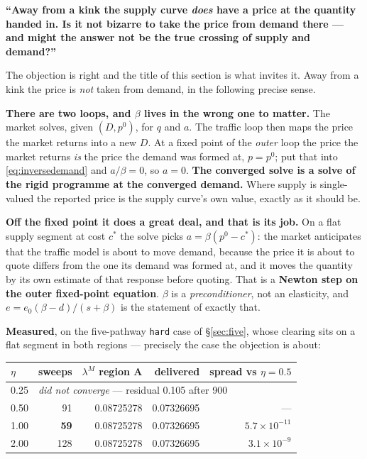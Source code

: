 \documentclass[11pt,a4paper]{article}
\newcommand{\var}[1]{\texttt{\small #1}}
\begin{document}
\begin{keybox}
\textbf{``Away from a kink the supply curve \emph{does} have a price at the quantity handed
in. Is it not bizarre to take the price from demand there --- and might the answer not be
the true crossing of supply and demand?''}

\medskip
The objection is right and the title of this section is what invites it. Away from a kink
the price is \emph{not} taken from demand, in the following precise sense.

\medskip
\textbf{There are two loops, and $\beta$ lives in the wrong one to matter.} The market
solves, given $(D, p^{0})$, for $q$ and $a$. The traffic loop then maps the price the
market returns into a new $D$. At a fixed point of the \emph{outer} loop the price the
market returns \emph{is} the price the demand was formed at, $p = p^{0}$; put that into
\eqref{eq:inversedemand} and $a/\beta = 0$, so $a = 0$. \textbf{The converged solve is a
solve of the rigid programme at the converged demand.} Where supply is single-valued the
reported price is the supply curve's own value, exactly as it should be.

\medskip
\textbf{Off the fixed point it does a great deal, and that is its job.} On a flat supply
segment at cost $c^{*}$ the solve picks $a = \beta(p^{0} - c^{*})$: the market anticipates
that the traffic model is about to move demand, because the price it is about to quote
differs from the one its demand was formed at, and it moves the quantity by its own
estimate of that response before quoting. That is a \textbf{Newton step on the outer
fixed-point equation}. $\beta$ is a \emph{preconditioner}, not an elasticity, and
$e = e_{0}(\beta-d)/(s+\beta)$ is the statement of exactly that.

\medskip
\textbf{Measured}, on the five-pathway \var{hard} case of \S\ref{sec:five}, whose clearing
sits on a flat segment in both regions --- precisely the case the objection is about:

\medskip
\begin{center}\small
\begin{tabular}{@{}lrrrr@{}}
\toprule
$\eta$ & \textbf{sweeps} & $\lambda^{M}$ region A & \textbf{delivered} &
  \textbf{spread vs $\eta=0.5$} \\
\midrule
0.25 & \multicolumn{4}{l}{\emph{did not converge} --- residual 0.105 after 900} \\
0.50 & 91 & 0.08725278 & 0.07326695 & --- \\
1.00 & \textbf{59} & 0.08725278 & 0.07326695 & $5.7\times10^{-11}$ \\
2.00 & 128 & 0.08725278 & 0.07326695 & $3.1\times10^{-9}$ \\
\bottomrule
\end{tabular}
\end{center}
\medskip


\end{keybox}
\end{document}
